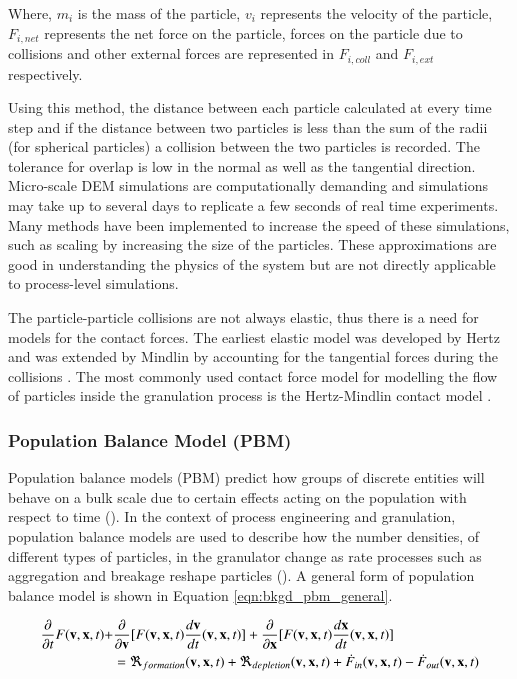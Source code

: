 \documentclass[preprint,11pt,authoryear]{elsarticle}
\begin{document}
Where, $m_i$ is the mass of the particle, $v_i$ represents the velocity of 
the particle, $F_{i,net}$  represents the net force on the particle, forces on the particle due to collisions 
and other external forces are represented in $F_{i,coll}$ and $F_{i,ext}$ respectively.

Using this method, the distance between each particle calculated at every time step and if the distance between two 
particles is less than the sum of the radii (for spherical particles)  a collision between the two particles 
is recorded. The tolerance for overlap is low in the normal as well as the tangential direction. 
Micro-scale DEM simulations are computationally demanding and simulations may take up to several 
days to replicate a few seconds of real time experiments. Many methods have been implemented to 
increase the speed of these simulations, such as scaling by increasing the size of the particles. These 
approximations are good in understanding the physics of the system but are not directly applicable to 
process-level simulations. 

The particle-particle collisions are not always elastic, thus there is a need for models for the 
contact forces. The earliest elastic model was developed by Hertz and was extended by Mindlin 
by accounting for the  tangential forces during the collisions \citep{adams2000}. The most commonly used contact 
force model for modelling the flow of particles inside the granulation process 
is the Hertz-Mindlin contact model \citep{gantt2006}\citep{hassanpour2013}. 
 

\subsubsection{Population Balance Model (PBM)}
     Population balance models (PBM) predict how groups of discrete entities will behave on a 
    bulk scale due to certain effects acting on the population with respect to time 
    (\cite{ramkrishna2014}). In the context of process engineering and granulation, population 
    balance models are used to describe how the number densities, of different types of particles, in 
    the granulator change as rate processes such as aggregation and breakage reshape particles 
    (\cite{Barrasso2013}). A general form of population balance model is shown in Equation 
    \ref{eqn:bkgd_pbm_general}.
    
    \begin{align}
    \frac{ \partial}{\partial t}F(\textbf{v},\textbf{x},t) +& \frac{\partial}{\partial 
        \textbf{v}}[F(\textbf{v},\textbf{x},t)\frac{d\textbf{v}}{dt}(\textbf{v},\textbf{x},t)] + 
    \frac{\partial}{\partial \textbf{x}}[F(\textbf{v},\textbf{x},t)\frac{d\textbf{x}}{dt}(\textbf{v},\textbf{x},t)] 
    \notag\\
    &= 
    \Re_{formation}(\textbf{v},\textbf{x},t)+\Re_{depletion}(\textbf{v},\textbf{x},t)+\dot{F}_{in}(\textbf{v},
    \textbf{x},t)-\dot{F}_{out}(\textbf{v},\textbf{x},t)
    \label{eqn:bkgd_pbm_general} 
    \end{align}
    
\end{document}
